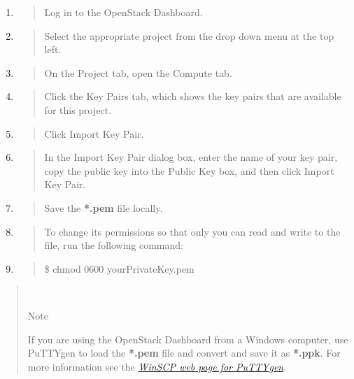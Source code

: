 \begin{enumerate}
\def\labelenumi{\arabic{enumi}.}
\item
  \begin{quote}
  Log in to the \gls{OpenStack Dashboard}.
  \end{quote}
\item
  \begin{quote}
  Select the appropriate project from the drop down menu at the top
  left.
  \end{quote}
\item
  \begin{quote}
  On the Project tab, open the Compute tab.
  \end{quote}
\item
  \begin{quote}
  Click the Key Pairs tab, which shows the key pairs that are available
  for this project.
  \end{quote}
\item
  \begin{quote}
  Click Import Key Pair.
  \end{quote}
\item
  \begin{quote}
  In the Import Key Pair dialog box, enter the name of your key pair,
  copy the public key into the Public Key box, and then click Import Key
  Pair.
  \end{quote}
\item
  \begin{quote}
  Save the \textbf{*.pem} file locally.
  \end{quote}
\item
  \begin{quote}
  To change its permissions so that only you can read and write to the
  file, run the following command:
  \end{quote}
\item
  \begin{quote}
  \$ chmod 0600 yourPrivateKey.pem
  \end{quote}
\end{enumerate}

\begin{quote}
~

Note

If you are using the \gls{OpenStack Dashboard} from a Windows computer, use PuTTYgen to
load the \textbf{*.pem} file and convert and save it as \textbf{*.ppk}.
For more information see the
\href{https://winscp.net/eng/docs/ui_puttygen}{\emph{WinSCP web page for
PuTTYgen}}.
\end{quote}

